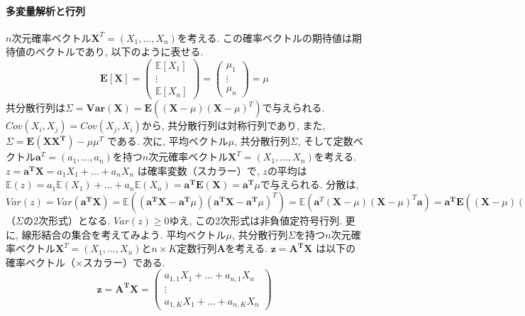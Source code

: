 \documentclass[paper=a4paper,fontsize=10pt]{jlreq}
\begin{document}
\paragraph{多変量解析と行列}
$n$次元確率ベクトル$\mathbf{X}^T=(X_1,\dots,X_n)$を考える. この確率ベクトルの期待値は期待値のベクトルであり, 以下のように表せる.
\begin{equation*}
  \mathbf{E[X]} = \begin{pmatrix} \mathbf{\mathbb{E}}[X_1] \\ \vdots \\ \mathbf{\mathbb{E}}[X_n] \end{pmatrix} = \begin{pmatrix} \mu_1 \\ \vdots \\ \mu_n \end{pmatrix} = \mu
\end{equation*}
共分散行列は$\Sigma=\mathbf{Var(X)}=\mathbf{E}((\mathbf{X}-\mu)(\mathbf{X}-\mu)^T)$で与えられる. $Cov(X_i, X_j)=Cov(X_j, X_i)$から, 共分散行列は対称行列であり, また, $\Sigma=\mathbf{E(XX^T)}-{\mu\mu^T}$ である. 次に, 平均ベクトル$\mu$, 共分散行列$\Sigma$, そして定数ベクトル$\mathbf{a}^T=(a_1,\dots,a_n)$を持つ$n$次元確率ベクトル$\mathbf{X}^T=(X_1,\dots,X_n)$を考える. $z=\mathbf{a^T X}=a_1X_1+\dots+a_nX_n$ は確率変数（スカラー）で,  $z$の平均は$\mathbb{E}(z)=a_1\mathbb{E}(X_1)+\dots+a_n\mathbb{E}(X_n)=\mathbf{a^T E(X)}=\mathbf{a^T}\mu$で与えられる. 分散は, $Var(z)=Var(\mathbf{a^T X})=\mathbb{E}((\mathbf{a^T X-a^T} \mu)(\mathbf{a^T X-a^T} \mu)^T)=\mathbb{E}(\mathbf{a}^T (\mathbf{X}-\mu)(\mathbf{X}-\mu)^T \mathbf{a})=\mathbf{a^T}\mathbf{E}({(\mathbf{X}-\mu)(\mathbf{X}-\mu)^T })\mathbf{a}=\mathbf{a^T}\mathbf{Var(X)}\mathbf{a}=\mathbf{a^T} \Sigma \mathbf{a}$（$\Sigma$の2次形式）となる. $Var(z)\geq 0$ゆえ, この2次形式は非負値定符号行列. 更に, 線形結合の集合を考えてみよう. 平均ベクトル$\mu$, 共分散行列$\Sigma$を持つ$n$次元確率ベクトル$\mathbf{X}^T=(X_1,\dots,X_n)$と$n\times K$定数行列$\mathbf{A}$を考える. $\mathbf{z}=\mathbf{A^T X}$ は以下の確率ベクトル（×スカラー）である.
\begin{equation*}
  \mathbf{z}=\mathbf{A^T X} = \begin{pmatrix} a_{1, 1}X_1+\dots+a_{n, 1}X_n \\ \vdots \\ a_{1, K}X_1+\dots+a_{n, K}X_n \end{pmatrix}
\end{equation*}
\end{document}
